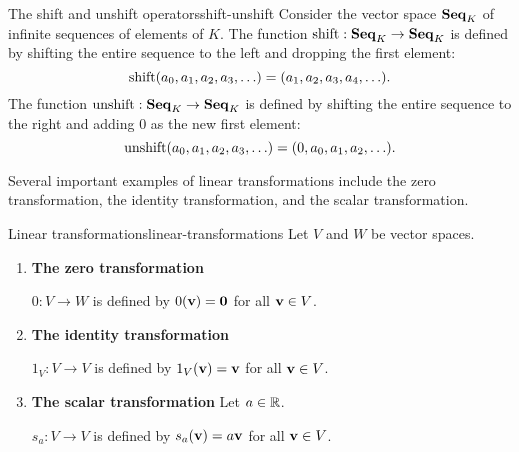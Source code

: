 \begin{example}{The shift and unshift operators}{shift-unshift}
  Consider the vector space $\mathbf{Seq}_K$ of infinite sequences of elements
  of $K$. The function $\shift:\Seq_K\to\Seq_K$ is defined by shifting
  the entire sequence to the left and dropping the first element:
  \begin{equation*}
    \shift(a_0,a_1,a_2,a_3,\ldots) = (a_1,a_2,a_3,a_4,\ldots).
  \end{equation*}
  The function $\unshift:\Seq_K\to\Seq_K$ is defined by shifting the
  entire sequence to the right and adding $0$ as the new first
  element:
  \begin{equation*}
    \unshift(a_0,a_1,a_2,a_3,\ldots) = (0,a_0,a_1,a_2,\ldots).
  \end{equation*}


\end{example}



Several important examples of linear transformations include the zero
transformation, the identity transformation, and the scalar
transformation.

\begin{example}{Linear transformations}{linear-transformations}
  Let $V$ and $W$ be vector spaces.

  \begin{enumerate}
  \item \textbf{The zero transformation}

    $0:V\to W$ is defined by $0(\mbox{\bf v})=\mbox{\bf 0}$ for all
    $\mbox{\bf v}\in V$.

  \item \textbf{The identity transformation}

    $1_V:V\to V$ is defined by $1_V(\mbox{\bf v})=\mbox{\bf v}$ for all
    $\mbox{\bf v}\in V$.

  \item \textbf{The scalar transformation} Let $a\in\mathbb{R}$.

    $s_a:V\to V$ is defined by $s_a(\mbox{\bf v})=a\mbox{\bf v}$ for all
    $\mbox{\bf v}\in V$.
  \end{enumerate}
\end{example}

